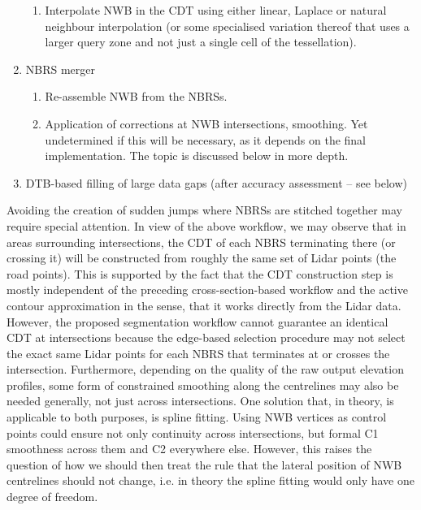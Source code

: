 \begin{enumerate}
\begin{enumerate}
            \item Interpolate NWB in the CDT using either linear, Laplace or natural neighbour interpolation (or some specialised variation thereof that uses a larger query zone and not just a single cell of the tessellation).
        \end{enumerate}
    \item NBRS merger
        \begin{enumerate}
            \item Re-assemble NWB from the NBRSs.
            \item Application of corrections at NWB intersections, smoothing. Yet undetermined if this will be necessary, as it depends on the final implementation. The topic is discussed below in more depth.
        \end{enumerate}
    \item DTB-based filling of large data gaps (after accuracy assessment – see below)
\end{enumerate}

Avoiding the creation of sudden jumps where NBRSs are stitched together may require special attention. In view of the above workflow, we may observe that in areas surrounding intersections, the CDT of each NBRS terminating there (or crossing it) will be constructed from roughly the same set of Lidar points (the road points). This is supported by the fact that the CDT construction step is mostly independent of the preceding cross-section-based workflow and the active contour approximation in the sense, that it works directly from the Lidar data. However, the proposed segmentation workflow cannot guarantee an identical CDT at intersections because the edge-based selection procedure may not select the exact same Lidar points for each NBRS that terminates at or crosses the intersection. Furthermore, depending on the quality of the raw output elevation profiles, some form of constrained smoothing along the centrelines may also be needed generally, not just across intersections. One solution that, in theory, is applicable to both purposes, is spline fitting. Using NWB vertices as control points could ensure not only continuity across intersections, but formal C1 smoothness across them and C2 everywhere else. However, this raises the question of how we should then treat the rule that the lateral position of NWB centrelines should not change, i.e. in theory the spline fitting would only have one degree of freedom.

